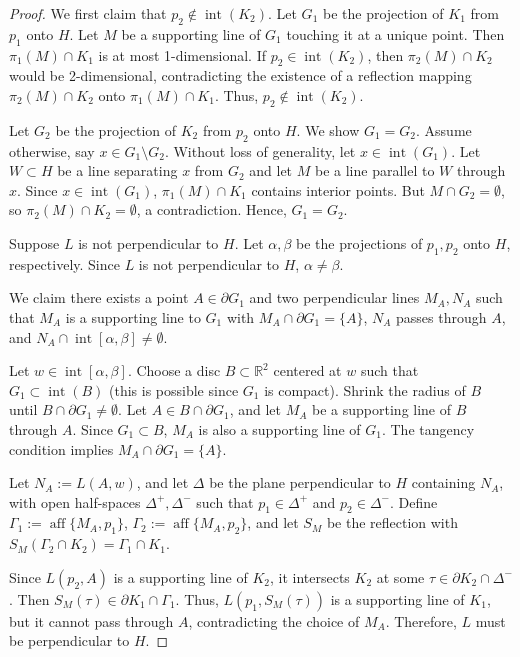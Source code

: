 \documentclass[12pt]{article}
\begin{document}
	\begin{proof}
		We first claim that $p_2 \notin \operatorname{int}(K_2)$. Let $G_1$ be the projection of $K_1$ from $p_1$ onto $H$. Let $M$ be a supporting line of $G_1$ touching it at a unique point. Then $\pi_1(M) \cap K_1$ is at most 1-dimensional. If $p_2 \in \operatorname{int}(K_2)$, then $\pi_2(M) \cap K_2$ would be 2-dimensional, contradicting the existence of a reflection mapping $\pi_2(M) \cap K_2$ onto $\pi_1(M) \cap K_1$. Thus, $p_2 \notin \operatorname{int}(K_2)$.
		
		Let $G_2$ be the projection of $K_2$ from $p_2$ onto $H$. We show $G_1 = G_2$. Assume otherwise, say $x \in G_1 \setminus G_2$. Without loss of generality, let $x \in \operatorname{int}(G_1)$. Let $W \subset H$ be a line separating $x$ from $G_2$ and let $M$ be a line parallel to $W$ through $x$. Since $x \in \operatorname{int}(G_1)$, $\pi_1(M) \cap K_1$ contains interior points. But $M \cap G_2 = \emptyset$, so $\pi_2(M) \cap K_2 = \emptyset$, a contradiction. Hence, $G_1 = G_2$.
		
		Suppose $L$ is not perpendicular to $H$. Let $\alpha, \beta$ be the projections of $p_1, p_2$ onto $H$, respectively. Since $L$ is not perpendicular to $H$, $\alpha \neq \beta$.
		
		We claim there exists a point $A \in \partial G_1$ and two perpendicular lines $M_A, N_A$ such that $M_A$ is a supporting line to $G_1$ with $M_A \cap \partial G_1 = \{A\}$, $N_A$ passes through $A$, and $N_A \cap \operatorname{int}[\alpha, \beta] \neq \emptyset$.
		
		Let $w \in \operatorname{int}[\alpha, \beta]$. Choose a disc $B \subset \mathbb{R}^2$ centered at $w$ such that $G_1 \subset \operatorname{int}(B)$ (this is possible since $G_1$ is compact). Shrink the radius of $B$ until $B \cap \partial G_1 \neq \emptyset$. Let $A \in B \cap \partial G_1$, and let $M_A$ be a supporting line of $B$ through $A$. Since $G_1 \subset B$, $M_A$ is also a supporting line of $G_1$. The tangency condition implies $M_A \cap \partial G_1 = \{A\}$.
		
		Let $N_A := L(A, w)$, and let $\Delta$ be the plane perpendicular to $H$ containing $N_A$, with open half-spaces $\Delta^+, \Delta^-$ such that $p_1 \in \Delta^+$ and $p_2 \in \Delta^-$. Define $\Gamma_1 := \operatorname{aff}\{M_A, p_1\}$, $\Gamma_2 := \operatorname{aff}\{M_A, p_2\}$, and let $S_M$ be the reflection with $S_M(\Gamma_2 \cap K_2) = \Gamma_1 \cap K_1$.
		
		Since $L(p_2, A)$ is a supporting line of $K_2$, it intersects $K_2$ at some $\tau \in \partial K_2 \cap \Delta^-$. Then $S_M(\tau) \in \partial K_1 \cap \Gamma_1$. Thus, $L(p_1, S_M(\tau))$ is a supporting line of $K_1$, but it cannot pass through $A$, contradicting the choice of $M_A$. Therefore, $L$ must be perpendicular to $H$.
	\end{proof}
	
\end{document}
